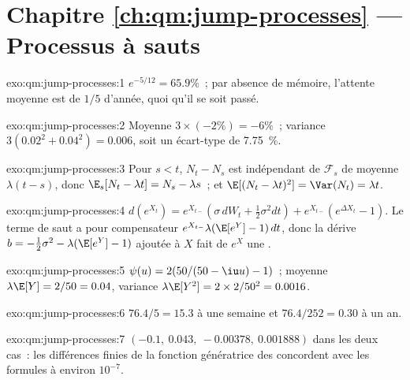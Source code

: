 \section*{Chapitre \ref{ch:qm:jump-processes} --- Processus à sauts}

\begin{solution}{exo:qm:jump-processes:1}
$e^{-5/12} = 65.9\%$~; par absence de mémoire, l'attente moyenne est de $1/5$ d'année, quoi qu'il se soit passé.
\end{solution}

\begin{solution}{exo:qm:jump-processes:2}
Moyenne $3 \times (-2\%) = -6\%$~; variance $3(0.02^2 + 0.04^2) = 0.006$, soit un écart-type de 7.75~\%.
\end{solution}

\begin{solution}{exo:qm:jump-processes:3}
Pour $s < t$, $N_t - N_s$ est indépendant de $\mathcal F_s$ de moyenne $\lambda(t - s)$, donc $\E_s[N_t - \lambda t] = N_s - \lambda s$~;
et $\E[(N_t - \lambda t)^2] = \Var(N_t) = \lambda t$.
\end{solution}

\begin{solution}{exo:qm:jump-processes:4}
$d(e^{X_t}) = e^{X_{t-}}(\sigma\,dW_t + \tfrac12\sigma^2dt) + e^{X_{t-}}(e^{\Delta X_t} - 1)$. Le terme de saut a pour compensateur
$e^{X_{t-}}\lambda(\E[e^Y] - 1)\,dt$, donc la dérive $b = -\tfrac12\sigma^2 - \lambda(\E[e^Y] - 1)$ ajoutée à $X$ fait de $e^X$ une
.
\end{solution}

\begin{solution}{exo:qm:jump-processes:5}
$\psi(u) = 2(50/(50 - \iu u) - 1)$~; moyenne $\lambda\E[Y] = 2/50 = 0.04$, variance $\lambda\E[Y^2] = 2 \times 2/50^2 = 0.0016$.
\end{solution}

\begin{solution}{exo:qm:jump-processes:6}
$76.4/5 = 15.3$ à une semaine et $76.4/252 = 0.30$ à un an.
\end{solution}

\begin{solution}{exo:qm:jump-processes:7}
$(-0.1,\ 0.043,\ -0.00378,\ 0.001888)$ dans les deux cas~: les différences finies de la fonction
génératrice des  concordent avec les formules à environ $10^{-7}$.
\end{solution}

